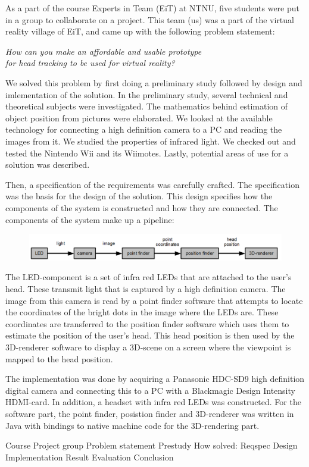 As a part of the course Experts in Team (EiT) at NTNU, five students were put in a group to collaborate on a project. This team (us) was a part of the virtual reality village of EiT, and came up with the following problem statement:

\begin{center}\em How can you make an affordable and usable prototype\\for head tracking to be used for virtual reality?\end{center}

We solved this problem by first doing a preliminary study followed by design and imlementation of the solution. In the preliminary study, several technical and theoretical subjects were investigated. The mathematics behind estimation of object position from pictures were elaborated. We looked at the available technology for connecting a high definition camera to a PC and reading the images from it. We studied the properties of infrared light. We checked out and tested the Nintendo Wii and its Wiimotes. Lastly, potential areas of use for a solution was described.

Then, a specification of the requirements was carefully crafted. The specification was the basis for the design of the solution. This design specifies how the components of the system is constructed and how they are connected. The components of the system make up a pipeline:

\begin{figure}[h]
\centering
\includegraphics[width=\textwidth]{graphics/main_design_english.png}
\end{figure}

The LED-component is a set of infra red LEDs that are attached to the user's head. These transmit light that is captured by a high definition camera. The image from this camera is read by a point finder software that attempts to locate the coordinates of the bright dots in the image where the LEDs are. These coordinates are transferred to the position finder software which uses them to estimate the position of the user's head. This head position is then used by the 3D-renderer software to display a 3D-scene on a screen where the viewpoint is mapped to the head position.

The implementation was done by acquiring a Panasonic HDC-SD9 high definition digital camera and connecting this to a PC with a Blackmagic Design Intensity HDMI-card. In addition, a headset with infra red LEDs was constructed. For the software part, the point finder, posistion finder and 3D-renderer was written in Java with bindings to native machine code for the 3D-rendering part.

Course
Project group
Problem statement
Prestudy
How solved:
	Reqspec
	Design
	Implementation
Result
Evaluation
Conclusion